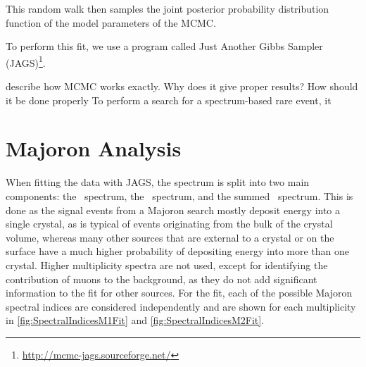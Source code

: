 This random walk then samples the joint posterior probability distribution function of the model parameters of the MCMC.
 
To perform this fit, we use a program called Just Another Gibbs Sampler (JAGS)\footnote{\RaggedRight\url{http://mcmc-jags.sourceforge.net/}}.

describe how MCMC works exactly. Why does it give proper results? How should it be done properly
To perform a search for a spectrum-based rare event, it 

\section{Majoron Analysis}
When fitting the data with JAGS, the spectrum is split into two main components: the \Mone~spectrum, the \Mtwo~spectrum, and the summed \Msum~spectrum. This is done as the signal events from a Majoron search mostly deposit energy into a single crystal, as is typical of events originating from the bulk of the crystal volume, whereas many other sources that are external to a crystal or on the surface have a much higher probability of depositing energy into more than one crystal. Higher multiplicity spectra are not used, except for identifying the contribution of muons to the background, as they do not add significant information to the fit for other sources. For the fit, each of the possible Majoron spectral indices are considered independently and are shown for each multiplicity in \autoref{fig:SpectralIndicesM1Fit} and \autoref{fig:SpectralIndicesM2Fit}.


